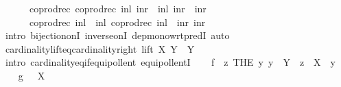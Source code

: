 \begin{isabellebody}
\ \ \ \ \ \ {\isacharparenleft}{\kern0pt}coprod{\isacharunderscore}{\kern0pt}rec\ {\isacharparenleft}{\kern0pt}coprod{\isacharunderscore}{\kern0pt}rec\ inl\ {\isacharparenleft}{\kern0pt}inr\ {\isasymcirc}\ inl{\isacharparenright}{\kern0pt}{\isacharparenright}{\kern0pt}\ {\isacharparenleft}{\kern0pt}inr\ {\isasymcirc}\ inr{\isacharparenright}{\kern0pt}{\isacharparenright}{\kern0pt}\isanewline
\ \ \ \ \ \ {\isacharparenleft}{\kern0pt}coprod{\isacharunderscore}{\kern0pt}rec\ {\isacharparenleft}{\kern0pt}inl\ {\isasymcirc}\ inl{\isacharparenright}{\kern0pt}\ {\isacharparenleft}{\kern0pt}coprod{\isacharunderscore}{\kern0pt}rec\ {\isacharparenleft}{\kern0pt}inl\ {\isasymcirc}\ inr{\isacharparenright}{\kern0pt}\ inr{\isacharparenright}{\kern0pt}{\isacharparenright}{\kern0pt}{\isachardoublequoteclose}\isanewline
\ \ \ \ \ \isamarkupfalse%
\ {\isacharparenleft}{\kern0pt}intro\ bijection{\isacharunderscore}{\kern0pt}onI\ inverse{\isacharunderscore}{\kern0pt}onI\ dep{\isacharunderscore}{\kern0pt}mono{\isacharunderscore}{\kern0pt}wrt{\isacharunderscore}{\kern0pt}predI{\isacharparenright}{\kern0pt}\ auto\isanewline
\ \isamarkupfalse%
%
\endisatagproof
{\isafoldproof}%
%
\isadelimproof
\isanewline
%
\endisadelimproof
\isanewline
{}\isamarkupfalse%
\ cardinality{\isacharunderscore}{\kern0pt}lift{\isacharunderscore}{\kern0pt}eq{\isacharunderscore}{\kern0pt}cardinality{\isacharunderscore}{\kern0pt}right{\isacharcolon}{\kern0pt}\ {\isachardoublequoteopen}{\isacharbar}{\kern0pt}lift\ X\ Y{\isacharbar}{\kern0pt}\ {\isacharequal}{\kern0pt}\ {\isacharbar}{\kern0pt}Y{\isacharbar}{\kern0pt}{\isachardoublequoteclose}\isanewline
%
\isadelimproof
%
\endisadelimproof
%
\isatagproof
{}\isamarkupfalse%
\ {\isacharparenleft}{\kern0pt}intro\ cardinality{\isacharunderscore}{\kern0pt}eq{\isacharunderscore}{\kern0pt}if{\isacharunderscore}{\kern0pt}equipollent\ equipollentI{\isacharparenright}{\kern0pt}\isanewline
\ \ \isamarkupfalse%
\ {\isacharquery}{\kern0pt}f\ {\isacharequal}{\kern0pt}\ {\isachardoublequoteopen}{\isasymlambda}z{\isachardot}{\kern0pt}\ THE\ y{\isachardot}{\kern0pt}\ y\ {\isasymin}\ Y\ {\isasymand}\ z\ {\isacharequal}{\kern0pt}\ X\ {\isacharplus}{\kern0pt}\ y{\isachardoublequoteclose}\isanewline
\ \ \isamarkupfalse%
\ {\isacharquery}{\kern0pt}g\ {\isacharequal}{\kern0pt}\ {\isachardoublequoteopen}{\isacharparenleft}{\kern0pt}{\isacharparenleft}{\kern0pt}{\isacharplus}{\kern0pt}{\isacharparenright}{\kern0pt}\ X{\isacharparenright}{\kern0pt}{\isachardoublequoteclose}\isanewline
\ \ \isamarkupfalse%

\end{isabellebody}
